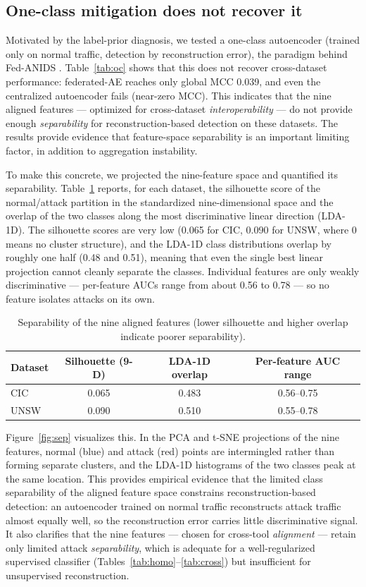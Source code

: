 \documentclass[11pt,a4paper]{article}
\begin{document}
\subsection{One-class mitigation does not recover it}
\label{sec:oc}
Motivated by the label-prior diagnosis, we tested a one-class autoencoder
(trained only on normal traffic, detection by reconstruction error), the paradigm
behind Fed-ANIDS \cite{fedanids}. Table~\ref{tab:oc} shows that this does not
recover cross-dataset performance: federated-AE reaches only global MCC 0.039,
and even the centralized autoencoder fails (near-zero MCC). This indicates that
the nine aligned features --- optimized for cross-dataset \emph{interoperability}
--- do not provide enough \emph{separability} for reconstruction-based detection on
these datasets. The results provide evidence that feature-space separability is an
important limiting factor, in addition to aggregation instability.

To make this concrete, we projected the nine-feature space and quantified its
separability. Table~\ref{tab:sep} reports, for each dataset, the silhouette score
of the normal/attack partition in the standardized nine-dimensional space and the
overlap of the two classes along the most discriminative linear direction
(LDA-1D). The silhouette scores are very low (0.065 for CIC, 0.090 for UNSW,
where 0 means no cluster structure), and the LDA-1D class distributions overlap by
roughly one half (0.48 and 0.51), meaning that even the single best linear
projection cannot cleanly separate the classes. Individual features are only
weakly discriminative --- per-feature AUCs range from about 0.56 to 0.78 --- so no
feature isolates attacks on its own.

\begin{table}[htbp]
\centering\small
\caption{Separability of the nine aligned features (lower silhouette and higher
overlap indicate poorer separability).}
\label{tab:sep}
\begin{tabular}{@{}lccc@{}}
\toprule
Dataset & Silhouette (9-D) & LDA-1D overlap & Per-feature AUC range \\
\midrule
CIC  & 0.065 & 0.483 & 0.56--0.75 \\
UNSW & 0.090 & 0.510 & 0.55--0.78 \\
\bottomrule
\end{tabular}
\end{table}

Figure~\ref{fig:sep} visualizes this. In the PCA and t-SNE projections of the nine
features, normal (blue) and attack (red) points are intermingled rather than
forming separate clusters, and the LDA-1D histograms of the two classes peak at
the same location. This provides empirical evidence that the limited class
separability of the aligned feature space constrains reconstruction-based
detection: an autoencoder trained on normal traffic reconstructs attack traffic
almost equally well, so the
reconstruction error carries little discriminative signal. It also clarifies that
the nine features --- chosen for cross-tool \emph{alignment} --- retain only
limited attack \emph{separability}, which is adequate for a well-regularized
supervised classifier (Tables~\ref{tab:homo}--\ref{tab:cross}) but insufficient for
unsupervised reconstruction.
\end{document}
